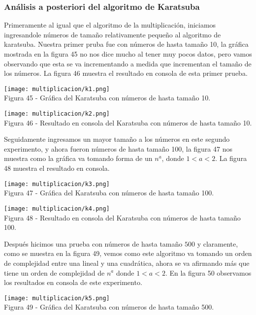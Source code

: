 \documentclass[12pt,twoside]{article}
\begin{document}
\subsubsection{Análisis a posteriori del algoritmo de Karatsuba}
Primeramente al igual que el algoritmo de la multiplicación, iniciamos ingresandole números de tamaño relativamente pequeño al algoritmo de karatsuba. Nuestra primer pruba fue con números de hasta tamaño 10, la gráfica mostrada en la figura 45 no nos dice mucho al tener muy pocos datos, pero vamos observando que esta se va incrementando a medida que incrementan el tamaño de los números. La figura 46 muestra el resultado en consola de esta primer prueba.
\begin{center}
    \texttt{[image: multiplicacion/k1.png]}\\
    Figura 45 - Gráfica del Karatsuba con números de hasta tamaño 10.
\end{center}
\begin{center}
    \texttt{[image: multiplicacion/k2.png]}\\
    Figura 46 - Resultado en consola del Karatsuba con números de hasta tamaño 10.
\end{center}
Seguidamente ingresamos un mayor tamaño a los números en este segundo experimento, y ahora fueron números de hasta tamaño 100, la figura 47 nos muestra como la gráfica va tomando forma de un $n^a$, donde $1 < a < 2$. La figura 48 muestra el resultado en consola.
\begin{center}
    \texttt{[image: multiplicacion/k3.png]}\\
    Figura 47 - Gráfica del Karatsuba con números de hasta tamaño 100.
\end{center}
\begin{center}
    \texttt{[image: multiplicacion/k4.png]}\\
    Figura 48 - Resultado en consola del Karatsuba con números de hasta tamaño 100.
\end{center}
Después hicimos una prueba con números de hasta tamaño $500$ y claramente, como se muestra en la figura 49, vemos como este algoritmo va tomando un orden de complejidad entre una lineal y una cuadrática, ahora se va afirmando más que tiene un orden de complejidad de $n^a$ donde $1 < a < 2$. En la figura 50 observamos los resultados en consola de este experimento.
\begin{center}
    \texttt{[image: multiplicacion/k5.png]}\\
    Figura 49 - Gráfica del Karatsuba con números de hasta tamaño 500.
\end{center}
\end{document}
